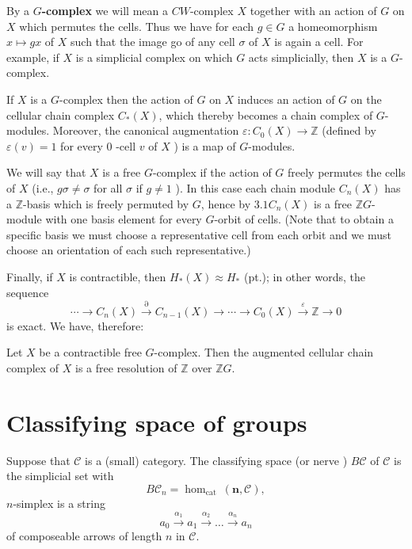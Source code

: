 By a \textbf{$G$-complex} we will mean a $C W$-complex $X$ together with an action of $G$ on $X$ which permutes the cells. Thus we have for each $g \in G$ a homeomorphism $x \mapsto g x$ of $X$ such that the image go of any cell $\sigma$ of $X$ is again a cell. For example, if $X$ is a simplicial complex on which $G$ acts simplicially, then $X$ is a $G$-complex.

If $X$ is a $G$-complex then the action of $G$ on $X$ induces an action of $G$ on the cellular chain complex $C_*(X)$, which thereby becomes a chain complex of $G$-modules. Moreover, the canonical augmentation $\varepsilon: C_0(X) \rightarrow \mathbb{Z}$ (defined by $\varepsilon(v)=1$ for every 0 -cell $v$ of $X$ ) is a map of $G$-modules.

We will say that $X$ is a free $G$-complex if the action of $G$ freely permutes the cells of $X$ (i.e., $g \sigma \neq \sigma$ for all $\sigma$ if $g \neq 1$ ). In this case each chain module $C_n(X)$ has a $\mathbb{Z}$-basis which is freely permuted by $G$, hence by $3.1 C_n(X)$ is a free $\mathbb{Z} G$-module with one basis element for every $G$-orbit of cells. (Note that to obtain a specific basis we must choose a representative cell from each orbit and we must choose an orientation of each such representative.)

Finally, if $X$ is contractible, then $H_*(X) \approx H_*$ (pt.); in other words, the sequence
$$
\cdots \rightarrow C_n(X) \stackrel{\partial}{\rightarrow} C_{n-1}(X) \rightarrow \cdots \rightarrow C_0(X) \stackrel{\varepsilon}{\rightarrow} \mathbb{Z} \rightarrow 0
$$
is exact. We have, therefore:

\begin{prop}
    
    Let $X$ be a contractible free $G$-complex. Then the augmented cellular chain complex of $X$ is a free resolution of $\mathbb{Z}$ over $\mathbb{Z} G$.
\end{prop}




\section{Classifying space of groups}

Suppose that $\mathcal{C}$ is a (small) category. The classifying space (or nerve ) $B \mathcal{C}$ of $\mathcal{C}$ is the simplicial set with
$$
B \mathcal{C}_n=\operatorname{hom}_{\text {cat }}(\mathbf{n}, \mathcal{C}),
$$
$n$-simplex is a string
$$
a_0 \xrightarrow{\alpha_1} a_1 \xrightarrow{\alpha_2} \ldots \xrightarrow{\alpha_n} a_n
$$
of composeable arrows of length $n$ in $\mathcal{C}$.\\

